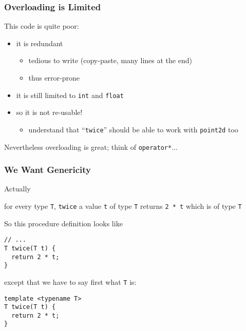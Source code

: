 \documentclass{beamer}
\newcommand{\code}[1]{{\scriptsize{\texttt{#1}}}\xspace}
\newcommand{\pointIId}{\code{point2d}}
\begin{document}
\begin{frame}
  \frametitle{Overloading is Limited}

This code is quite poor:

\begin{itemize}
\item it is redundant
  \begin{itemize}
  \item tedious to write (copy-paste, many lines at the end)
  \item thus error-prone
  \end{itemize}
  \smallskip
\item it is still limited to \code{int} and \code{float}
  \smallskip
\item so it is not re-usable!
  \begin{itemize}
  \item understand that ``\code{twice}'' should be able to work with
    \pointIId too
  \end{itemize}
\end{itemize}

Nevertheless overloading is great; think of \code{operator*}...

\end{frame}


\begin{frame}[fragile]
  \frametitle{We Want Genericity}

Actually
\begin{center}
  for every type \code{T}, \code{twice} a value \code{t} of type
  \code{T} returns \code{2 * t} which is of type \code{T}
\end{center}

So this procedure definition looks like
\begin{lstlisting}
// ...
T twice(T t) {
  return 2 * t;
}
\end{lstlisting}
except that we have to say first what \code{T} is:
\begin{lstlisting}
template <typename T>
T twice(T t) {
  return 2 * t;
}
\end{lstlisting}

\end{frame}
\end{document}
